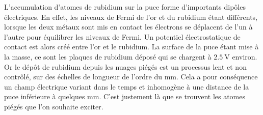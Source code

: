 L'accumulation d'atomes de rubidium sur la puce forme d'importants dipôles électriques.
En effet, les niveaux de Fermi de l'or et du rubidium étant différents, lorsque les deux métaux sont mis en contact les électrons se déplacent de l'un à l'autre pour équilibrer les niveaux de Fermi.
Un potentiel électrostatique de contact est alors créé entre l'or et le rubidium.
La surface de la puce étant mise à la masse, ce sont les plaques de rubidium déposé qui se chargent à $\SI{2.5}{\V}$ environ.
Or le dépôt de rubidium depuis les nuages piégés est un processus lent et non contrôlé, sur des échelles de longueur de l'ordre du $\si{\mm}$.
Cela a pour conséquence un champ électrique variant dans le temps et inhomogène à une distance de la puce inférieure à quelques $\si{\mm}$.
C'est justement là que se trouvent les atomes piégés que l'on souhaite exciter.

